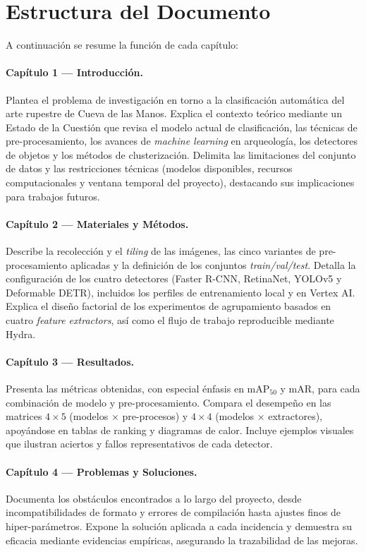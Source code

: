 \section{Estructura del Documento}\label{sec:estructura_documento}

A continuación se resume la función de cada capítulo:

\paragraph{Capítulo 1 — Introducción.}
Plantea el problema de investigación en torno a la clasificación automática del arte rupestre de Cueva de las Manos.
Explica el contexto teórico mediante un Estado de la Cuestión que revisa el modelo actual de clasificación, las técnicas de pre-procesamiento, los avances de \textit{machine learning} en arqueología, los detectores de objetos y los métodos de clusterización.
Delimita las limitaciones del conjunto de datos y las restricciones técnicas (modelos disponibles, recursos computacionales y ventana temporal del proyecto), destacando sus implicaciones para trabajos futuros.

\paragraph{Capítulo 2 — Materiales y Métodos.}
Describe la recolección y el \emph{tiling} de las imágenes, las cinco variantes de pre-procesamiento aplicadas y la definición de los conjuntos \textit{train/val/test}.
Detalla la configuración de los cuatro detectores (Faster R-CNN, RetinaNet, YOLOv5 y Deformable DETR), incluidos los perfiles de entrenamiento local y en Vertex AI.
Explica el diseño factorial de los experimentos de agrupamiento basados en cuatro \emph{feature extractors}, así como el flujo de trabajo reproducible mediante Hydra.

\paragraph{Capítulo 3 — Resultados.}
Presenta las métricas obtenidas, con especial énfasis en \(\mathrm{mAP}_{50}\) y \(\mathrm{mAR}\), para cada combinación de modelo y pre-procesamiento.
Compara el desempeño en las matrices \(4\times5\) (modelos × pre-procesos) y \(4\times4\) (modelos × extractores), apoyándose en tablas de ranking y diagramas de calor.
Incluye ejemplos visuales que ilustran aciertos y fallos representativos de cada detector.

\paragraph{Capítulo 4 — Problemas y Soluciones.}
Documenta los obstáculos encontrados a lo largo del proyecto, desde incompatibilidades de formato y errores de compilación hasta ajustes finos de hiper-parámetros.
Expone la solución aplicada a cada incidencia y demuestra su eficacia mediante evidencias empíricas, asegurando la trazabilidad de las mejoras.

